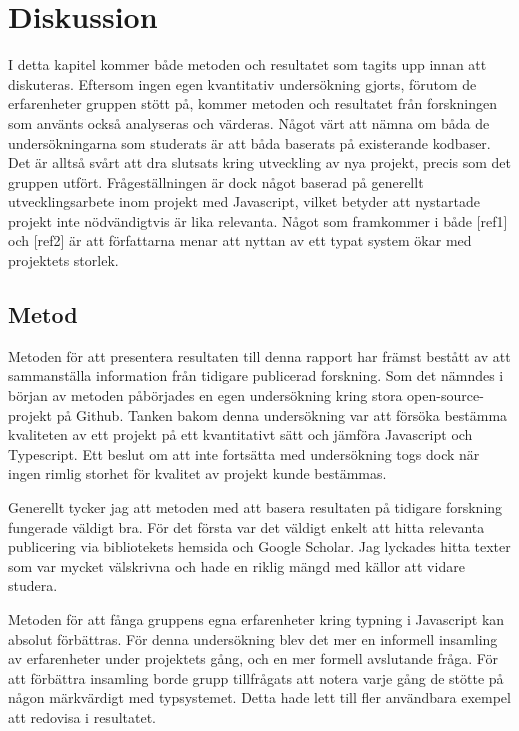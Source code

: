 \section{Diskussion}
\label{sec:alexander-discussion}

I detta kapitel kommer både metoden och resultatet som tagits upp innan att diskuteras. Eftersom ingen egen kvantitativ undersökning gjorts, förutom de erfarenheter gruppen stött på, kommer metoden och resultatet från forskningen som använts också analyseras och värderas.  Något värt att nämna om båda de undersökningarna som studerats är att båda baserats på existerande kodbaser. Det är alltså svårt att dra slutsats kring utveckling av nya projekt, precis som det gruppen utfört. Frågeställningen är dock något baserad på generellt utvecklingsarbete inom projekt med Javascript, vilket betyder att nystartade projekt inte nödvändigtvis är lika relevanta. Något som framkommer i både [ref1] och [ref2] är att författarna menar att nyttan av ett typat system ökar med projektets storlek. 


\subsection{Metod}
\label{subsec:alexander-discussion-method}

Metoden för att presentera resultaten till denna rapport har främst bestått av att sammanställa information från tidigare publicerad forskning. Som det nämndes i början av metoden påbörjades en egen undersökning kring stora open-source-projekt på Github. Tanken bakom denna undersökning var att försöka bestämma kvaliteten av ett projekt på ett kvantitativt sätt och jämföra Javascript och Typescript. Ett beslut om att inte fortsätta med undersökning togs dock när ingen rimlig storhet för kvalitet av projekt kunde bestämmas.

Generellt tycker jag att metoden med att basera resultaten på tidigare forskning fungerade väldigt bra. För det första var det väldigt enkelt att hitta relevanta publicering via bibliotekets hemsida och Google Scholar. Jag lyckades hitta texter som var mycket välskrivna och hade en riklig mängd med källor att vidare studera.

Metoden för att fånga gruppens egna erfarenheter kring typning i Javascript kan absolut förbättras. För denna undersökning blev det mer en informell insamling av erfarenheter under projektets gång, och en mer formell avslutande fråga. För att förbättra insamling borde grupp tillfrågats att notera varje gång de stötte på någon märkvärdigt med typsystemet. Detta hade lett till fler användbara exempel att redovisa i resultatet.

